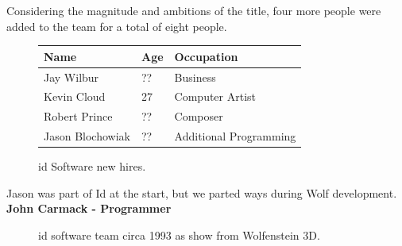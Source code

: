 \documentclass[book.tex]{subfiles}
\begin{document}
Considering the magnitude and ambitions of the title, four more people were added to the team for a total of eight people.\\

 \begin{figure}[H]
\centering  
\begin{tabularx}{\textwidth}{ X  X  X  }
  \toprule
  \textbf{Name} &  \textbf{Age} & \textbf{Occupation} \\
  \toprule 
   Jay Wilbur & ?? &  Business\\
   Kevin Cloud & 27 &  Computer Artist\\
   Robert Prince & ?? &  Composer\\
   Jason Blochowiak & ?? &  Additional Programming\\
     \toprule
\end{tabularx}
\caption{id Software new hires.}\label{fig:Id Software hires}
\end{figure}

\begin{fancyquotes}
Jason was part of Id at the start, but we parted ways during Wolf development.
 \bigskip \\
\textbf{John Carmack - Programmer}
 \end{fancyquotes}
 
\begin{figure}[H]
\centering
\caption{id software team circa 1993 as show from Wolfenstein 3D.}
\label{fig:id_team_1993}
\end{figure}
\end{document}
